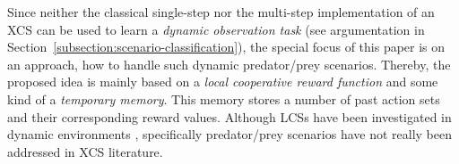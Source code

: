 Since neither the classical single-step nor the multi-step implementation of an XCS \cite{BW02} can be used to learn a \emph{dynamic observation task} %
(see argumentation in Section~\ref{subsection:scenario-classification}), the special focus of this paper is on an approach, how to handle such dynamic predator/prey scenarios. Thereby, the proposed idea is mainly based on a \emph{local cooperative reward function} and some kind of a \emph{temporary memory}. This memory stores a number of past action sets and their corresponding reward values. 
Although LCSs have been investigated in dynamic environments \cite{Lan98,LW00}, specifically predator/prey scenarios have not really been addressed in XCS literature. %



